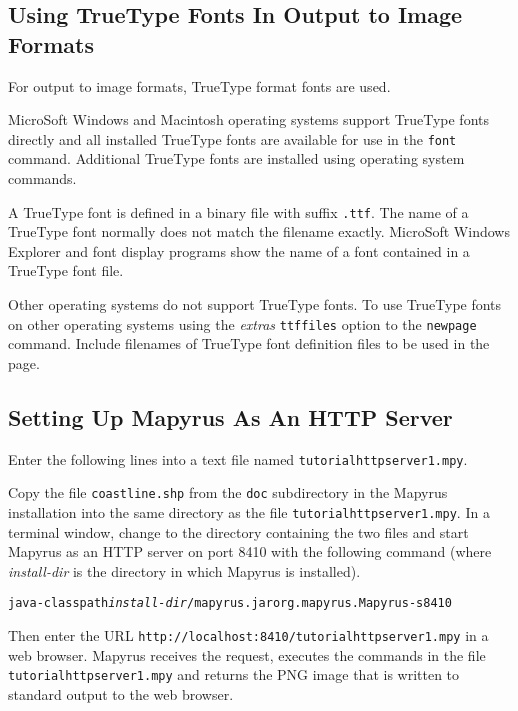 \subsection{Using TrueType Fonts In Output to Image Formats}
\label{ttffonts}

For output to image formats, TrueType format fonts are used.

MicroSoft Windows and Macintosh operating systems support TrueType
fonts directly and all installed TrueType fonts are available
for use in the \texttt{font} command.
Additional TrueType fonts are installed using operating system commands.

A TrueType font is defined in a binary file with suffix
\texttt{.ttf}.
The name of a TrueType font normally does not match the filename exactly.
MicroSoft Windows Explorer and font display programs show the name of
a font contained in a TrueType font file.

Other operating systems do not support TrueType fonts.  To use TrueType fonts
on other operating systems using the \textit{extras} \texttt{ttffiles} option
to the \texttt{newpage} command.  Include filenames of TrueType font definition
files to be used in the page.

\subsection{Setting Up Mapyrus As An HTTP Server}
\label{tutorialhttpserver}

Enter the following lines into a text file named
\texttt{tutorialhttpserver1.mpy}.



Copy the file \texttt{coastline.shp} from the \texttt{doc} subdirectory in the
Mapyrus installation into the same directory as the file
\texttt{tutorialhttpserver1.mpy}.  In a terminal window, change to the
directory containing the two files and start Mapyrus as an HTTP server on port
8410 with the following command
(where \textit{install-dir} is the directory in which Mapyrus is installed).

\begin{alltt}
java -classpath \textit{install-dir}/mapyrus.jar org.mapyrus.Mapyrus -s 8410
\end{alltt}

Then enter the URL \texttt{http://localhost:8410/tutorialhttpserver1.mpy} in a
web browser.  Mapyrus receives the request, executes the commands in the file
\texttt{tutorialhttpserver1.mpy} and returns the PNG image that is written to
standard output to the web browser.

